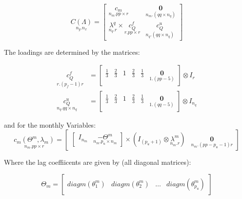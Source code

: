 \documentclass[12pt]{article}
\begin{document}
\begin{appendices}
\begin{equation*}
\underset{n_{y}.n_{x}}{C(\Lambda)} =
\begin{bmatrix}
\underset{n_{m}.pp\times r}{c_{m}} 
& \underset{n_{m}.(qq\times n_{q})}{\textbf{0}}\\
\underset{n_{q}.r}{\lambda^{q}} \times \underset{r.pp\times r}{ c_{Q}^{f} } 
& \underset{n_{q}.(qq\times n_{q})}{ c_{Q}^{u} }
\end{bmatrix}
\end{equation*}

The loadings are determined by the matrices:

\begin{equation}
\begin{aligned}
\underset{r.(p_{f}-1)r}{ c_{Q}^{f} } &= 
\begin{bmatrix}
\frac{1}{3} 
& \frac{2}{3}
& 1
& \frac{2}{3}
& \frac{1}{3}
& \underset{1.(pp-5)}{\textbf{0}} 
\end{bmatrix}
\otimes I_{r}\\
\underset{n_{q}.qq\times n_{q}}{ c_{Q}^{u} } &=
\begin{bmatrix}
\frac{1}{3}
& \frac{2}{3}
& 1
& \frac{2}{3}
& \frac{1}{3}
& \underset{1.(qq-5)}{\textbf{0}}
\end{bmatrix}
\otimes I_{n_{q}}
\end{aligned}
\end{equation}

and for the monthly Variables:
\begin{equation}
\underset{n_{m}.pp\times r}{c_{m}(\Theta^{m}, \lambda_{m})} = 
\begin{bmatrix}
\begin{bmatrix}
I_{n_{m}} & \underset{n_{m}.p_{u} \times n_{m}}{-\Theta^{m}} 
\end{bmatrix}
\times \left(I_{(p_{u}+1)} \otimes \underset{n_{m}.r}{\lambda^{m}}\right) & \underset{n_{m}.(pp-p_{u}-1)r}{\textbf{0}}
\end{bmatrix}
\end{equation}

Where the lag coeffiicents are given by (all diagonal matrices):

\begin{equation*}
\Theta_{m} =
\begin{bmatrix}
diagm(\theta_{1}^{m}) & diagm(\theta_{2}^{m}) & \dots & diagm(\theta_{p_{u}}^{m})
\end{bmatrix}
\end{equation*}



\end{appendices}
\end{document}
